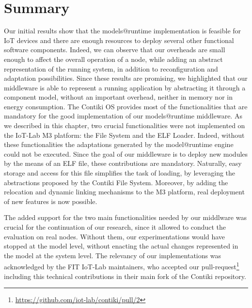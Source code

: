 \section{Summary}
Our initial results show that the models@runtime implementation is feasible for IoT devices and there are enough resources to deploy several other functional software components.
Indeed, we can observe that our overheads are small enough to affect the overall operation of a node, while adding an abstract representation of the running system, in addition to reconfiguration and adaptation possibilities.
Since these results are promising, we highlighted that our middleware is able to represent a running application by abstracting it through a component model, without an important overhead, neither in memory nor in energy consumption.
The Contiki OS provides most of the functionalities that are mandatory for the good implementation of our models@runtime middleware.
As we described in this chapter, two crucial functionalities were not implemented on the IoT-Lab M3 platform: the File System and the ELF Loader.
Indeed, without these functionalities the adaptations generated by the model@runtime engine could not be executed.
Since the goal of our middleware is to deploy new modules by the means of an ELF file, these contributions are mandatory.
Naturally, easy storage and access for this file simplifies the task of loading, by leveraging the abstractions proposed by the Contiki File System.
Moreover, by adding the relocation and dynamic linking mechanisms to the M3 platform, real deployment of new features is now possible.

The added support for the two main functionalities needed by our middlware was crucial for the continuation of our research, since it allowed to conduct the evaluation on real nodes.
Without them, our experimentations would have stopped at the model level, without enacting the actual changes represented in the model at the system level.
The relevancy of our implementations was acknowledged by the FIT IoT-Lab maintainers, who accepted our pull-request\footnote{\url{https://github.com/iot-lab/contiki/pull/2}} including this technical contributions in their main fork of the Contiki repository.

